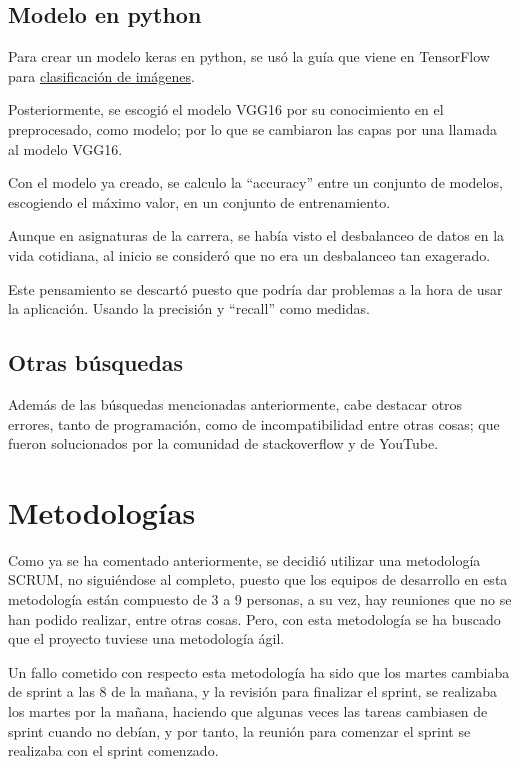 \subsection{Modelo en python}

Para crear un modelo keras en python, se usó la guía que viene en TensorFlow para \href{https://www.tensorflow.org/tutorials/images/classification?hl=es-419}{clasificación de imágenes}\cite{tensorflow-classification-tutorial}.

Posteriormente, se escogió el modelo VGG16 por su conocimiento en el preprocesado, como modelo; por lo que se cambiaron las capas por una llamada al modelo VGG16.

Con el modelo ya creado, se calculo la ``accuracy'' entre un conjunto de modelos, escogiendo el máximo valor, en un conjunto de entrenamiento. 

Aunque en asignaturas de la carrera, se había visto el desbalanceo de datos en la vida cotidiana, al inicio se consideró que no era un desbalanceo tan exagerado.

Este pensamiento se descartó puesto que podría dar problemas a la hora de usar la aplicación. Usando la precisión y ``recall'' como medidas.

\subsection{Otras búsquedas}

Además de las búsquedas mencionadas anteriormente, cabe destacar otros errores, tanto de programación, como de incompatibilidad entre otras cosas; que fueron solucionados por la comunidad de stackoverflow y de YouTube.
\section{Metodologías}

Como ya se ha comentado anteriormente, se decidió utilizar una metodología SCRUM, no siguiéndose al completo, puesto que los equipos de desarrollo en esta metodología están compuesto de 3 a 9 personas, a su vez, hay reuniones que no se han podido realizar, entre otras cosas. Pero, con esta metodología se ha buscado que el proyecto tuviese una metodología ágil.

Un fallo cometido con respecto esta metodología ha sido que los martes cambiaba de sprint a las 8 de la mañana, y la revisión para finalizar el sprint, se realizaba los martes por la mañana, haciendo que algunas veces las tareas cambiasen de sprint cuando no debían, y por tanto, la reunión para comenzar el sprint se realizaba con el sprint comenzado.

